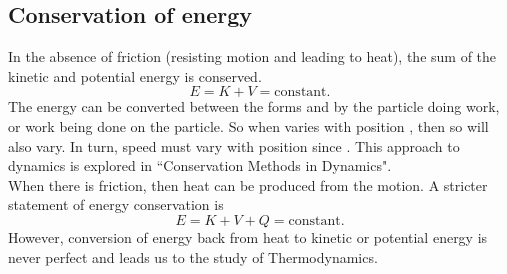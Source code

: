 \subsection{Conservation of energy}
In the absence of friction (resisting motion and leading to heat), the sum  of the kinetic and potential energy is conserved.
\begin{equation*} E = K + V =  \text{constant}.
\end{equation*}
The energy can be converted between the forms  and  by the particle doing work, or work being done on the particle. So when  varies with position , then so will  also vary.  In turn, speed  must vary with position since .  This approach to dynamics is explored in ``Conservation Methods in Dynamics".\\ When there is friction, then heat  can be produced from the motion.  A stricter statement of energy conservation is
\begin{equation*} E = K + V + Q =  \textrm{constant}.
\end{equation*}
However, conversion of energy  back from heat  to kinetic  or potential energy  is never perfect and leads us to the study of Thermodynamics.
